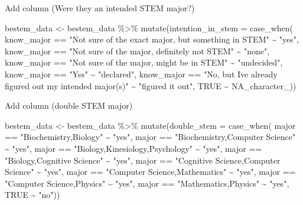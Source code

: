 \documentclass[
]{article}
\newenvironment{Shaded}{\begin{snugshade}}{\end{snugshade}}
\newcommand{\AttributeTok}[1]{\textcolor[rgb]{0.77,0.63,0.00}{#1}}
\newcommand{\ConstantTok}[1]{\textcolor[rgb]{0.00,0.00,0.00}{#1}}
\newcommand{\FunctionTok}[1]{\textcolor[rgb]{0.00,0.00,0.00}{#1}}
\newcommand{\NormalTok}[1]{#1}
\newcommand{\OtherTok}[1]{\textcolor[rgb]{0.56,0.35,0.01}{#1}}
\newcommand{\SpecialCharTok}[1]{\textcolor[rgb]{0.00,0.00,0.00}{#1}}
\newcommand{\StringTok}[1]{\textcolor[rgb]{0.31,0.60,0.02}{#1}}
\begin{document}
Add column (Were they an intended STEM major?)

\begin{Shaded}
\begin{Highlighting}[]
\NormalTok{bestem\_data }\OtherTok{\textless{}{-}}\NormalTok{ bestem\_data }\SpecialCharTok{\%\textgreater{}\%}
  \FunctionTok{mutate}\NormalTok{(}\AttributeTok{intention\_in\_stem =} \FunctionTok{case\_when}\NormalTok{(}
\NormalTok{  know\_major }\SpecialCharTok{==} \StringTok{"Not sure of the exact major, but something in STEM"} \SpecialCharTok{\textasciitilde{}} \StringTok{"yes"}\NormalTok{,}
\NormalTok{  know\_major }\SpecialCharTok{==} \StringTok{"Not sure of the major, definitely not STEM"} \SpecialCharTok{\textasciitilde{}} \StringTok{"none"}\NormalTok{,}
\NormalTok{  know\_major }\SpecialCharTok{==} \StringTok{"Not sure of the major, might be in STEM"} \SpecialCharTok{\textasciitilde{}} \StringTok{"undecided"}\NormalTok{,}
\NormalTok{  know\_major }\SpecialCharTok{==} \StringTok{"Yes"} \SpecialCharTok{\textasciitilde{}} \StringTok{"declared"}\NormalTok{,}
\NormalTok{  know\_major }\SpecialCharTok{==} \StringTok{"No, but I\textquotesingle{}ve already figured out my intended major(s)"} \SpecialCharTok{\textasciitilde{}} \StringTok{"figured it out"}\NormalTok{,}
  \ConstantTok{TRUE} \SpecialCharTok{\textasciitilde{}} \ConstantTok{NA\_character\_}\NormalTok{))}
\end{Highlighting}
\end{Shaded}

Add column (double STEM major)

\begin{Shaded}
\begin{Highlighting}[]
\NormalTok{bestem\_data }\OtherTok{\textless{}{-}}\NormalTok{ bestem\_data }\SpecialCharTok{\%\textgreater{}\%} 
  \FunctionTok{mutate}\NormalTok{(}\AttributeTok{double\_stem =} \FunctionTok{case\_when}\NormalTok{(}
\NormalTok{    major }\SpecialCharTok{==} \StringTok{"Biochemistry,Biology"} \SpecialCharTok{\textasciitilde{}} \StringTok{"yes"}\NormalTok{,}
\NormalTok{    major }\SpecialCharTok{==} \StringTok{"Biochemistry,Computer Science"} \SpecialCharTok{\textasciitilde{}} \StringTok{"yes"}\NormalTok{,}
\NormalTok{    major }\SpecialCharTok{==} \StringTok{"Biology,Kinesiology,Psychology"} \SpecialCharTok{\textasciitilde{}} \StringTok{"yes"}\NormalTok{,}
\NormalTok{    major }\SpecialCharTok{==} \StringTok{"Biology,Cognitive Science"} \SpecialCharTok{\textasciitilde{}} \StringTok{"yes"}\NormalTok{,}
\NormalTok{    major }\SpecialCharTok{==} \StringTok{"Cognitive Science,Computer Science"} \SpecialCharTok{\textasciitilde{}} \StringTok{"yes"}\NormalTok{,}
\NormalTok{    major }\SpecialCharTok{==} \StringTok{"Computer Science,Mathematics"} \SpecialCharTok{\textasciitilde{}} \StringTok{"yes"}\NormalTok{,}
\NormalTok{    major }\SpecialCharTok{==} \StringTok{"Computer Science,Physics"} \SpecialCharTok{\textasciitilde{}} \StringTok{"yes"}\NormalTok{,}
\NormalTok{    major }\SpecialCharTok{==} \StringTok{"Mathematics,Physics"} \SpecialCharTok{\textasciitilde{}} \StringTok{"yes"}\NormalTok{,}
    \ConstantTok{TRUE} \SpecialCharTok{\textasciitilde{}} \StringTok{"no"}\NormalTok{))}
\end{Highlighting}
\end{Shaded}
\end{document}
